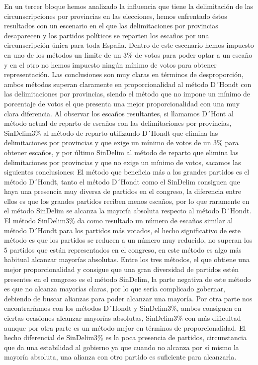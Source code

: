 \documentclass[12pt,a4paper,]{book}
\numberwithin{dummy}{section}
\theoremstyle{ocrenumbox}
\theoremstyle{blacknumex}
\theoremstyle{blacknumbox}
\theoremstyle{ocrenum}
\theoremstyle{ocrenum}
\begin{document}
En un tercer bloque hemos analizado la influencia que tiene la
delimitación de las circunscripciones por provincias en las elecciones,
hemos enfrentado éstos resultados con un escenario en el que las
delimitaciones por provincias desaparecen y los partidos políticos se
reparten los escaños por una circunscripción única para toda España.
Dentro de este escenario hemos impuesto en uno de los métodos un límite
de un 3\% de votos para poder optar a un escaño y en el otro no hemos
impuesto ningún mínimo de votos para obtener representación. Las
conclusiones son muy claras en términos de desproporción, ambos métodos
superan claramente en proporcionalidad al método D´Hondt con las
delimitaciones por provincias, siendo el método que no impone un mínimo
de porcentaje de votos el que presenta una mejor proporcionalidad con
una muy clara diferencia. Al observar los escaños resultantes, si
llamamos D´Hont al método actual de reparto de escaños con las
delimitaciones por provincias, SinDelim3\% al método de reparto
utilizando D´Hondt que elimina las delimitaciones por provincias y que
exige un mínimo de votos de un 3\% para obtener escaños, y por último
SinDelim al método de reparto que elimina las delimitaciones por
provincias y que no exige un mínimo de votos, sacamos las siguientes
conclusiones: El método que beneficia más a los grandes partidos es el
método D´Hondt, tanto el método D´Hondt como el SinDelim consiguen que
haya una presencia muy diversa de partidos en el congreso, la diferencia
entre ellos es que los grandes partidos reciben menos escaños, por lo
que raramente en el método SinDelim se alcanza la mayoría absoluta
respecto al método D´Hondt. El método SinDelim3\% da como resultado un
número de escaños similar al método D´Hondt para los partidos más
votados, el hecho significativo de este método es que los partidos se
reducen a un número muy reducido, no superan los 5 partidos que están
representados en el congreso, en este método es algo más habitual
alcanzar mayorías absolutas. Entre los tres métodos, el que obtiene una
mejor proporcionalidad y consigue que una gran diversidad de partidos
estén presentes en el congreso es el método SinDelim, la parte negativa
de este método es que no alcanza mayorías claras, por lo que sería
complicado gobernar, debiendo de buscar alianzas para poder alcanzar una
mayoría. Por otra parte nos encontraríamos con los métodos D´Hondt y
SinDelim3\%, ambos consiguen en ciertas ocasiones alcanzar mayorías
absolutas, SinDelim3\% con más dificultad aunque por otra parte es un
método mejor en términos de proporcionalidad. El hecho diferencial de
SinDelim3\% es la poca presencia de partidos, circunstancia que da una
estabilidad al gobierno ya que cuando no alcanza por sí mismo la mayoría
absoluta, una alianza con otro partido es suficiente para alcanzarla.
\end{document}
